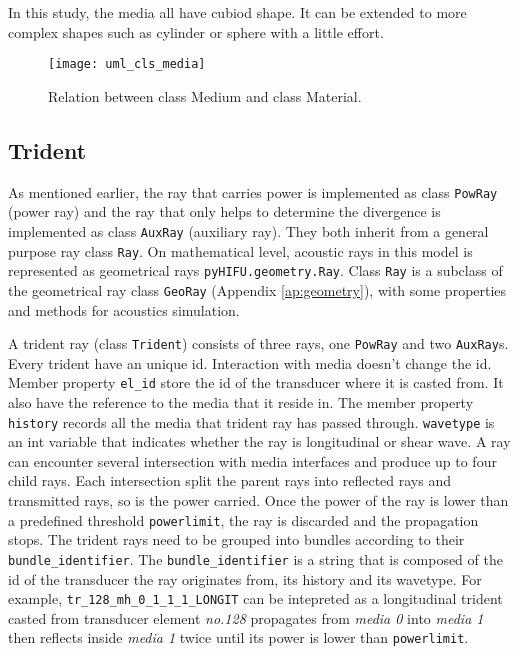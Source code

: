 In this study, the media all have cubiod shape. It can be extended to more complex shapes such as cylinder or sphere with a little effort.

\begin{figure}[h]
    \centering
    \texttt{[image: uml\_cls\_media]}
    \caption{Relation between class Medium and class Material.}
    \label{fig:uml_cls_media}
\end{figure}

\subsection{Trident}
As mentioned earlier, the ray that carries power is implemented as class \texttt{PowRay} (power ray) and the ray that only helps to determine the divergence is implemented as class \texttt{AuxRay} (auxiliary ray). They both inherit from a general purpose ray class \texttt{Ray}. On mathematical level, acoustic rays in this model is represented as geometrical rays \texttt{pyHIFU.geometry.Ray}. Class \texttt{Ray} is a subclass of the geometrical ray class \texttt{GeoRay} (Appendix \ref{ap:geometry}), with some properties and methods for acoustics simulation.

A trident ray (class \texttt{Trident}) consists of three rays, one \texttt{PowRay} and two \texttt{AuxRay}s. Every trident have an unique id. Interaction with media doesn't change the id. Member property \texttt{el\_id} store the id of the transducer where it is casted from. It also have the reference to the media that it reside in. The member property \texttt{history} records all the media that trident ray has passed through. \texttt{wavetype} is an int variable that indicates whether the ray is longitudinal or shear wave. A ray can encounter several intersection with media interfaces and produce up to four child rays. Each intersection split the parent rays into reflected rays and transmitted rays, so is the power carried. Once the power of the ray is lower than a predefined threshold \texttt{powerlimit}, the ray is discarded and the propagation stops.
The trident rays need to be grouped into bundles according to their \texttt{bundle\_identifier}. The \texttt{bundle\_identifier} is a string that is composed of the id of the transducer the ray originates from, its history and its wavetype. For example, \texttt{tr\_128\_mh\_0\_1\_1\_1\_LONGIT} can be intepreted as a longitudinal trident casted from transducer element \textit{no.128} propagates from \textit{media 0} into \textit{media 1} then reflects inside  \textit{media 1} twice until its power is lower than \texttt{powerlimit}.

